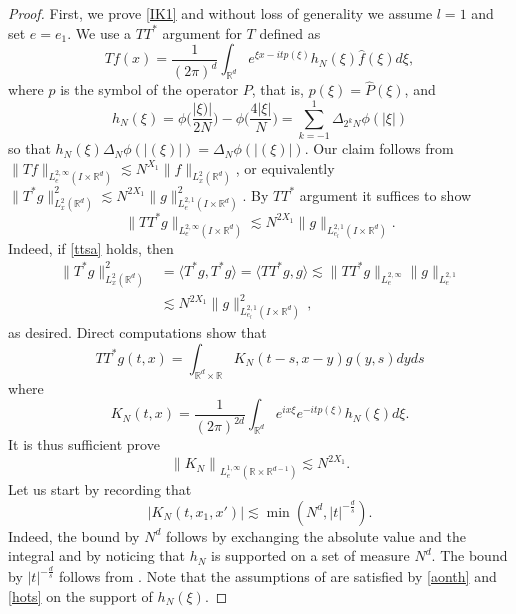 \documentclass[10pt,leqno]{amsart}
\newcommand{\R}{\mathbb{R}}
\numberwithin{equation}{section}
\begin{document}
\begin{proof}
First, we prove \eqref{IK1} and without loss of generality we assume $l=1$ and set $e = e_1$. We use a \(TT^{*}\) argument for $T$ defined as 
\begin{equation*}
T f(x)=\frac{1}{(2\pi)^{d}} \int_{\R^{d}} e^{\xi x - i t p(\xi)} h_{N}(\xi)\hat{f}(\xi)d \xi,
\end{equation*}
where $p$ is the symbol of the operator $P$, that is, $p(\xi)=\hat{P}(\xi)$, and
\begin{equation*}
h_{N}(\xi)=\phi\Big(\frac{|\xi)|}{2N}\Big)-\phi\Big(\frac{4|\xi|}{N}\Big)=\sum_{k=-1}^{1}\Delta_{2^{k}N}\phi(|\xi|)
\end{equation*}
so that \(h_{N}(\xi)\Delta_{N}\phi(|(\xi)|)=\Delta_{N}\phi(|(\xi)|)\). Our claim follows from \(\|Tf\|_{L_{e}^{2,\infty} (I\times \R^d)}\lesssim N^{X_{1}} \|f\|_{L^{2}_{x}(\R^{d})}\), 
or equivalently \(\|T^{*}g\|_{L^{2}_{x}(\R^{d})}^{2}\lesssim N^{2X_{1}}\|g\|_{L_{e}^{2,1} (I\times \R^d)}^{2}\). By  \(TT^{*}\) argument  it suffices to show 
\begin{equation}\label{ttsa}
\|TT^{*}g\|_{L_{e}^{2,\infty} (I\times \R^d)}\lesssim N^{2X_{1}}\|g\|_{L_{e_l}^{2,1} (I\times \R^d)}.
\end{equation}
Indeed, if \eqref{ttsa} holds, then
\begin{align*}
\|T^{*}g\|_{L^{2}_{x}(\R^{d})}^{2} &= \langle T^{*}g, T^{*}g \rangle = \langle TT^{*}g, g \rangle \lesssim \|TT^{*}g\|_{L^{2, \infty}_{e}} \|g\|_{L_{e}^{2,1}}
\\
&
\lesssim   N^{2X_{1}}\|g\|_{L_{e_l}^{2,1} (I\times \R^d)}^2 \,,
\end{align*}
as desired. 
Direct computations show that
\begin{equation*}
TT^{*}g (t, x)= \int_{\R^{d}\times\R} K_{N}(t-s,x -y) g(y, s) dy ds
\end{equation*}
where 
\begin{equation*}
 K_{N}(t,x) =\frac{1}{(2\pi)^{2d}}\int_{\R^{d}} e^{i x \xi} e^{-it p (\xi) }  h_{N}(\xi)d\xi.
\end{equation*}
It is thus sufficient prove
$$
\left\| K_{N}\right\|_{L^{1, \infty}_e (\R\times\R^{d-1})} \lesssim N^{2X_1}.
$$
Let us start by recording that 
$$| K_{N}(t,x_1 ,x')|\lesssim  \min (N^d , |t|^{-\frac{d}{s}}). $$
Indeed, the bound by $N^d$ follows by exchanging the absolute value and the integral and by noticing that \(h_{N}\) is supported on a set of measure \(N^{d}\). The bound by $|t|^{-\frac{d}{s}}$ follows from  \cite[Theorem 3.1]{MR3710698}.  Note that the assumptions of \cite[Theorem 3.1]{MR3710698} are satisfied by \eqref{aonth} and \eqref{hots} on the support of $h_N(\xi)$. 

\end{proof}
\end{document}
